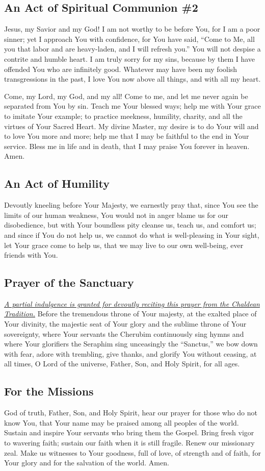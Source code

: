 \documentclass[12pt]{article}
\newcommand{\prayertitle}[1]{\subsection{#1}}
\newcommand{\indulgencedprayertitle}[1]{\prayertitle{#1 \protect\kreuz}}
\newcommand{\note}[1]{{\small{\textsl{#1}}}\newline}
\newcommand{\linkednote}[2]{\hyperlink{#1}{\note{#2}}}
\begin{document}
\prayertitle{An Act of Spiritual Communion \#2}
Jesus, my Savior and my God!
I am not worthy to be before You, for I am a poor sinner;
yet I approach You with confidence, for You have said, ``Come to Me, all you that labor and are heavy-laden, and I will refresh you.''
You will not despise a contrite and humble heart.
I am truly sorry for my sins, because by them I have offended You who are infinitely good.
Whatever may have been my foolish transgressions in the past, I love You now above all things, and with all my heart.

Come, my Lord, my God, and my all!
Come to me, and let me never again be separated from You by sin.
Teach me Your blessed ways;
help me with Your grace to imitate Your example;
to practice meekness, humility, charity, and all the virtues of Your Sacred Heart.
My divine Master, my desire is to do Your will and to love You more and more;
help me that I may be faithful to the end in Your service.
Bless me in life and in death, that I may praise You forever in heaven.
Amen.

\prayertitle{An Act of Humility}
Devoutly kneeling before Your Majesty,
we earnestly pray that, since You see the limits of our human weakness, You would not in anger blame us for our disobedience, but with Your boundless pity cleanse us, teach us, and comfort us;
and since if You do not help us, we cannot do what is well-pleasing in Your sight, let Your grace come to help us, that we may live to our own well-being, ever friends with You.

\indulgencedprayertitle{Prayer of the Sanctuary}
\linkednote{grant23}{A partial indulgence is granted for devoutly reciting this prayer from the Chaldean Tradition.}
Before the tremendous throne of Your majesty, at the exalted place of Your divinity, the majestic seat of Your glory and the sublime throne of Your sovereignty, where Your servants the Cherubim continuously sing hymns and where Your glorifiers the Seraphim sing unceasingly the ``Sanctus,'' we bow down with fear, adore with trembling, give thanks, and glorify You without ceasing, at all times, O Lord of the universe, Father, Son, and Holy Spirit, for all ages.

\prayertitle{For the Missions}
God of truth, Father, Son, and Holy Spirit, hear our prayer for those who do not know You, that Your name may be praised among all peoples of the world.
Sustain and inspire Your servants who bring them the Gospel.
Bring fresh vigor to wavering faith; sustain our faith when it is still fragile.
Renew our missionary zeal.
Make us witnesses to Your goodness, full of love, of strength and of faith, for Your glory and for the salvation of the world.
Amen.
\end{document}
